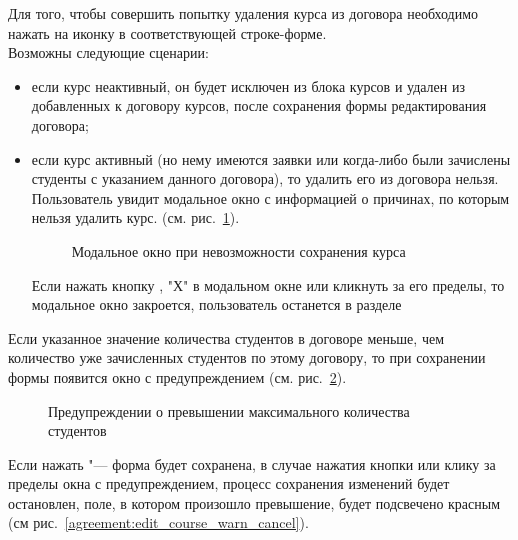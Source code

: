 	Для того, чтобы совершить попытку удаления курса из договора необходимо нажать на иконку  в соответствующей строке-форме. \\
Возможны следующие сценарии:
\begin{itemize}
	\item если курс неактивный, он будет исключен из блока курсов и удален из добавленных к договору курсов, после сохранения формы редактирования договора;
	\item если курс активный (но нему имеются заявки или когда-либо были зачислены студенты с указанием данного договора), то удалить его из договора нельзя. Пользователь увидит модальное окно с информацией о причинах, по которым нельзя удалить курс. (см. рис.~\ref{agreement:edit_course_warn}).
	\begin{figure}[H]
		\caption{Модальное окно при невозможности сохранения курса}
		\label{agreement:edit_course_warn}
	\end{figure}	
Если нажать кнопку , "Х" в модальном окне  или кликнуть за его пределы, то модальное окно закроется, пользователь останется в разделе 
\end{itemize}


Если указанное значение количества студентов в договоре меньше, чем количество уже зачисленных студентов по этому договору, то
при сохранении формы появится окно с предупреждением (см. рис.~\ref{agreement:edit_course_warn_number}).

		\begin{figure}[H]
		\caption{Предупреждении о превышении максимального количества студентов}
		\label{agreement:edit_course_warn_number}
		\end{figure}
		
Если нажать  "--- форма будет сохранена, в случае нажатия кнопки  или клику за пределы окна с предупреждением, процесс сохранения изменений будет остановлен, поле, в котором произошло превышение, будет подсвечено красным (см рис.~\ref{agreement:edit_course_warn_cancel}).	

